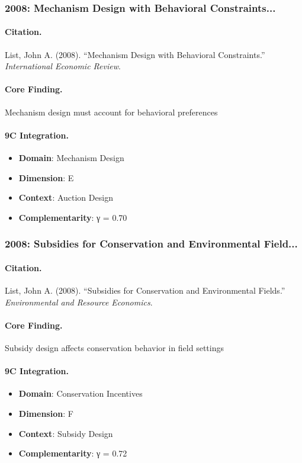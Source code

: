 \subsubsection{2008: Mechanism Design with Behavioral Constraints...}

\paragraph{Citation.}
List, John A. (2008). ``Mechanism Design with Behavioral Constraints.''
\textit{International Economic Review}.

\paragraph{Core Finding.}
Mechanism design must account for behavioral preferences

\paragraph{9C Integration.}
\begin{itemize}[nosep]
  \item \textbf{Domain}: Mechanism Design
  \item \textbf{Dimension}: E
  \item \textbf{Context}: Auction Design
  \item \textbf{Complementarity}: γ = 0.70
\end{itemize}


\subsubsection{2008: Subsidies for Conservation and Environmental Field...}

\paragraph{Citation.}
List, John A. (2008). ``Subsidies for Conservation and Environmental Fields.''
\textit{Environmental and Resource Economics}.

\paragraph{Core Finding.}
Subsidy design affects conservation behavior in field settings

\paragraph{9C Integration.}
\begin{itemize}[nosep]
  \item \textbf{Domain}: Conservation Incentives
  \item \textbf{Dimension}: F
  \item \textbf{Context}: Subsidy Design
  \item \textbf{Complementarity}: γ = 0.72
\end{itemize}



